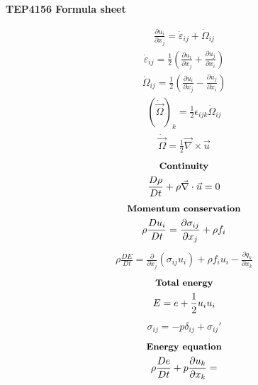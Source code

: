 \documentclass[10pt, a4paper]{article}
\begin{document}
\begin{center}
    \Large
    \textbf{TEP4156 Formula sheet}
    \vspace{0.5cm}
\end{center}

\begin{multicols}{2}
\begin{gather*}
    \frac{\partial u_i}{\partial x_j} = \dot{\varepsilon}_{ij} + \dot{\Omega}_{ij}
\end{gather*}
\begin{gather*}
    \dot{\varepsilon}_{ij} = \frac12\left( \frac{\partial u_i}{\partial x_j} +
    \frac{\partial u_j}{\partial x_i}\right)
\end{gather*}
\begin{gather*}
    \dot{\Omega}_{ij} = \frac12\left( \frac{\partial u_i}{\partial x_j} -
    \frac{\partial u_j}{\partial x_i}\right)
\end{gather*}
\begin{gather*}
    (\dot{\vec{\Omega}})_k = \frac12 \epsilon_{ijk}\dot{\Omega}_{ij}
\end{gather*}
\begin{gather*}
    \dot{\vec{\Omega}} = \frac12 \vec{\nabla}\times\vec{u}
\end{gather*}
\begin{gather*}
    \textbf{\small Continuity} \\
    \frac{D\rho}{Dt} + \rho \vec{\nabla} \cdot \vec{u} = 0
\end{gather*}
\begin{gather*}
    \textbf{\small Momentum conservation} \\
    \rho \frac{Du_i}{Dt} = \frac{\partial \sigma_{ij}}{\partial x_j} + \rho f_i
\end{gather*}
\begin{gather*}
    \rho \frac{DE}{Dt} = \frac{\partial}{\partial x_j}(\sigma_{ij} u_i) + \rho f_i u_i - \frac{\partial q_k}{\partial x_k}
\end{gather*}
\begin{gather*}
    \textbf{\small Total energy} \\
    E = e + \frac12 u_i u_i
\end{gather*}
\begin{gather*}
    \sigma_{ij} = -p \delta_{ij} + \sigma_{ij}'
\end{gather*}
\begin{gather*}
    \textbf{\small Energy equation} \\
    \rho \frac{De}{Dt} + p\frac{\partial u_k}{\partial x_k} =

\end{gather*}
\end{multicols}
\end{document}
